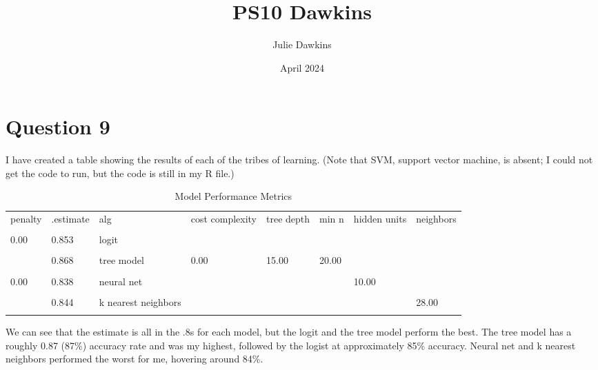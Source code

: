 \documentclass{article}
\title{PS10 Dawkins}
\author{Julie Dawkins}
\date{April 2024}
\begin{document}
\maketitle

\section{Question 9}

I have created a table showing the results of each of the tribes of learning. (Note that SVM, support vector machine, is absent; I could not get the code to run, but the code is still in my R file.)

\begin{table}[H]
  \centering
  \caption{Model Performance Metrics}
  \begin{tabular}[t]{llllllll}
    \toprule
    penalty & .estimate & alg & cost complexity & tree depth & min n & hidden units & neighbors\\\\
    \midrule
    0.00 & 0.853 & logit & & & & & \\\\
    & 0.868 & tree model & 0.00 & 15.00 & 20.00 & & \\\\
    0.00 & 0.838 & neural net & & & & 10.00 & \\\\
    & 0.844 & k nearest neighbors & & & & & 28.00\\\\
    \bottomrule
  \end{tabular}
\end{table}

We can see that the estimate is all in the .8s for each model, but the logit and the tree model perform the best. The tree model has a roughly 0.87 (87\%) accuracy rate and was my highest, followed by the logist at approximately 85\% accuracy. Neural net and k nearest neighbors performed the worst for me, hovering around 84\%. 
\end{document}
